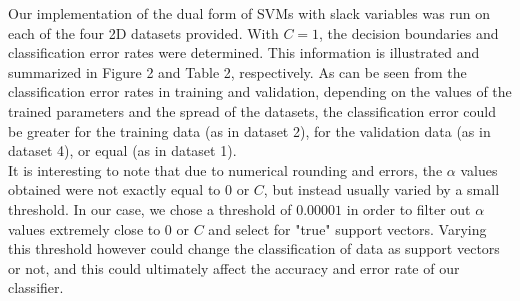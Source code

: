 \documentclass{article}
\begin{document}
Our implementation of the dual form of SVMs with slack variables was run on each of the four 2D datasets provided. With $C=1$, the decision boundaries and classification error rates were determined. This information is illustrated and summarized in Figure 2 and Table 2, respectively. As can be seen from the classification error rates in training and validation, depending on the values of the trained parameters and the spread of the datasets, the classification error could be greater for the training data (as in dataset 2), for the validation data (as in dataset 4), or equal (as in dataset 1). \\

It is interesting to note that due to numerical rounding and errors, the $\alpha$ values obtained were not exactly equal to 0 or $C$, but instead usually varied by a small threshold. In our case, we chose a threshold of $0.00001$ in order to filter out $\alpha$ values extremely close to 0 or $C$ and select for "true" support vectors. Varying this threshold however could change the classification of data as support vectors or not, and this could ultimately affect the accuracy and error rate of our classifier.
\end{document}
